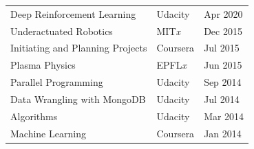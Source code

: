\documentclass[letterpaper]{deedy-resume} %
\begin{document}
\begin{minipage}[t]{0.66\textwidth}
\begin{tabular}{lll}
 Deep Reinforcement Learning & Udacity & Apr 2020 \\
 Underactuated Robotics & MIT{\it x} & Dec 2015 \\
 Initiating and Planning Projects & Coursera & Jul 2015 \\
 Plasma Physics & EPFL{\it x} & Jun 2015 \\
 Parallel Programming & Udacity & Sep 2014 \\
 Data Wrangling with MongoDB & Udacity & Jul 2014 \\
 Algorithms & Udacity & Mar 2014 \\
 Machine Learning & Coursera & Jan 2014 \\
\end{tabular}

\sectionspace %




\end{minipage} %








\end{document}
